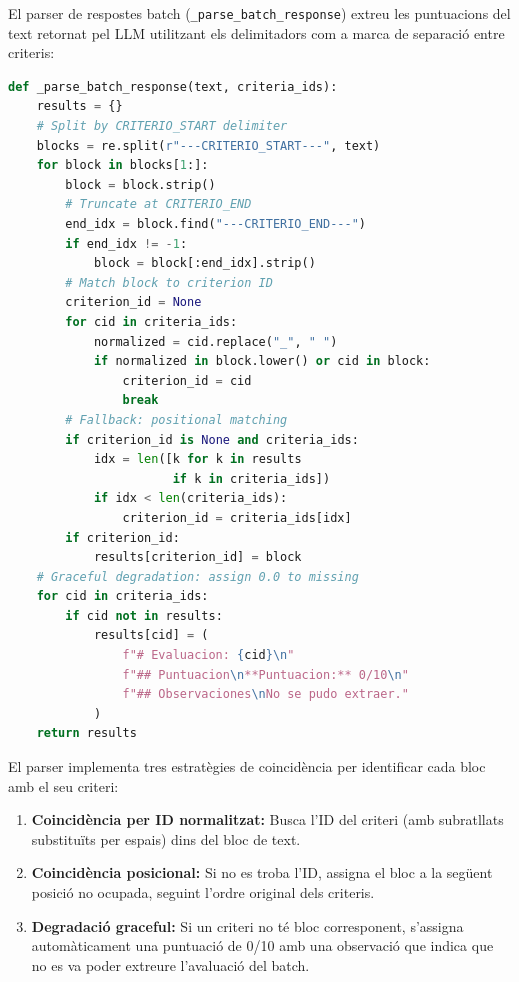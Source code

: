 \documentclass[12pt,a4paper,twoside]{report}
\begin{document}
El parser de respostes batch (\texttt{\_parse\_batch\_response}) extreu les puntuacions del text retornat pel LLM utilitzant els delimitadors com a marca de separaci\'o entre criteris:

\begin{lstlisting}[language=Python]
def _parse_batch_response(text, criteria_ids):
    results = {}
    # Split by CRITERIO_START delimiter
    blocks = re.split(r"---CRITERIO_START---", text)
    for block in blocks[1:]:
        block = block.strip()
        # Truncate at CRITERIO_END
        end_idx = block.find("---CRITERIO_END---")
        if end_idx != -1:
            block = block[:end_idx].strip()
        # Match block to criterion ID
        criterion_id = None
        for cid in criteria_ids:
            normalized = cid.replace("_", " ")
            if normalized in block.lower() or cid in block:
                criterion_id = cid
                break
        # Fallback: positional matching
        if criterion_id is None and criteria_ids:
            idx = len([k for k in results
                       if k in criteria_ids])
            if idx < len(criteria_ids):
                criterion_id = criteria_ids[idx]
        if criterion_id:
            results[criterion_id] = block
    # Graceful degradation: assign 0.0 to missing
    for cid in criteria_ids:
        if cid not in results:
            results[cid] = (
                f"# Evaluacion: {cid}\n"
                f"## Puntuacion\n**Puntuacion:** 0/10\n"
                f"## Observaciones\nNo se pudo extraer."
            )
    return results
\end{lstlisting}

El parser implementa tres estrat\`egies de coincid\`encia per identificar cada bloc amb el seu criteri:

\begin{enumerate}
    \item \textbf{Coincid\`encia per ID normalitzat:} Busca l'ID del criteri (amb subratllats substitu\"its per espais) dins del bloc de text.
    \item \textbf{Coincid\`encia posicional:} Si no es troba l'ID, assigna el bloc a la seg\"uent posici\'o no ocupada, seguint l'ordre original dels criteris.
    \item \textbf{Degradaci\'o graceful:} Si un criteri no t\'e bloc corresponent, s'assigna autom\`aticament una puntuaci\'o de 0/10 amb una observaci\'o que indica que no es va poder extreure l'avaluaci\'o del batch.
\end{enumerate}
\end{document}
